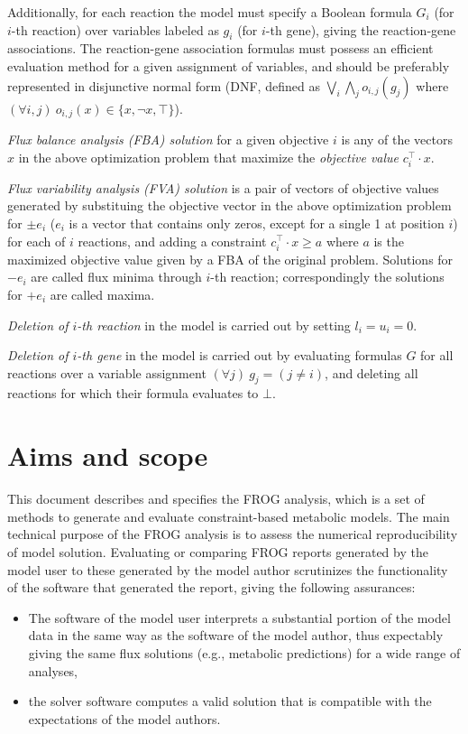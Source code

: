 Additionally, for each reaction the model must specify a Boolean formula $G_i$ (for $i$-th reaction) over variables labeled as $g_i$ (for $i$-th gene), giving the reaction-gene associations. The reaction-gene association formulas must possess an efficient evaluation method for a given assignment of variables, and should be preferably represented in disjunctive normal form (DNF, defined as $\bigvee_i\bigwedge_j o_{i,j}(g_j)$ where $(\forall i,j)\ o_{i,j}(x) \in \{x, \neg x, \top\}$).

\emph{Flux balance analysis (FBA) solution} for a given objective $i$ is any of the vectors $x$ in the above optimization problem that maximize the \emph{objective value} $c_i^\intercal \cdot x$.

\emph{Flux variability analysis (FVA) solution} is a pair of vectors of objective values generated by substituing the objective vector in the above optimization problem for $\pm e_i$ ($e_i$ is a vector that contains only zeros, except for a single 1 at position $i$) for each of $i$ reactions, and adding a constraint $c_i^\intercal\cdot x \geq a$ where $a$ is the maximized objective value given by a FBA of the original problem. Solutions for $-e_i$ are called flux minima through $i$-th reaction; correspondingly the solutions for $+e_i$ are called maxima.

\emph{Deletion of $i$-th reaction} in the model is carried out by setting $l_i = u_i = 0$.

\emph{Deletion of $i$-th gene} in the model is carried out by evaluating formulas $G$ for all reactions over a variable assignment $(\forall j)\ g_j = (j \neq i)$, and deleting all reactions for which their formula evaluates to $\bot$.~\cite{palsson2015systems}


\section{Aims and scope}

This document describes and specifies the FROG analysis, which is a set of methods to generate and evaluate constraint-based metabolic models. The main technical purpose of the FROG analysis is to assess the numerical reproducibility of model solution. Evaluating or comparing FROG reports generated by the model user to these generated by the model author scrutinizes the functionality of the software that generated the report, giving the following assurances:
\begin{itemize}
\item The software of the model user interprets a substantial portion of the model data in the same way as the software of the model author, thus expectably giving the same flux solutions (e.g., metabolic predictions) for a wide range of analyses,
\item the solver software computes a valid solution that is compatible with the expectations of the model authors.
\end{itemize}

